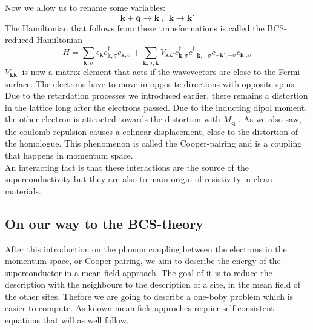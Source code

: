 \documentclass[../main.tex]{subfile}
\begin{document}
Now we allow us to rename some variables:
\[
    \bm{k} + \bm{q} \longrightarrow \bm{k} ~,~~ \bm{k} \longrightarrow \bm{k}'
\]
The Hamiltonian that follows from these transformations is called the BCS-reduced Hamiltonian
\begin{equation} \label{eq:BCS_ReducedHamiltonian}
    H = \sum_{\bm{k},\sigma} \epsilon_{\bm{k}} c_{\bm{k},\sigma}^{\dagger}c_{\bm{k},\sigma} + \sum_{\bm{k},\sigma,\bm{k}} V_{\bm{k}\bm{k}'} c_{\bm{k},\sigma}^{\dagger}c_{-\bm{k},-\sigma}^{\dagger}c_{-\bm{k}',-\sigma}c_{\bm{k}',\sigma}
\end{equation}
$V_{\bm{k}\bm{k}'}$ is now a matrix element that acts if the wavevectors are close to the Fermi-surface. The electrons have to move in opposite directions with opposite spins.
Due to the retardation processes we introduced earlier, there remains a distortion in the lattice long after the electrons passed. Due to the inducting dipol moment,
the other electron is attracted towards the distortion with $M_{\bm{q}}$ . As we also saw, the coulomb repulsion causes a colinear displacement, close to the distortion
of the homologue. This phenomenon is called the Cooper-pairing and is a coupling that happens in momentum space.\\

An interacting fact is that these interactions are the source of the superconductivity but they are also to main origin of resistivity in clean materials.

\subsection{On our way to the BCS-theory}
After this introduction on the phonon coupling between the electrons in the momentum space, or Cooper-pairing,
we aim to describe the energy of the superconductor in a mean-field approach. The goal of it is to reduce the description
with the neighbours to the description of a site, in the mean field of the other sites. Thefore we are going to describe 
a one-boby problem which is easier to compute. As known mean-fiels approches requier self-consistent equations that will as well follow.\\
\end{document}

